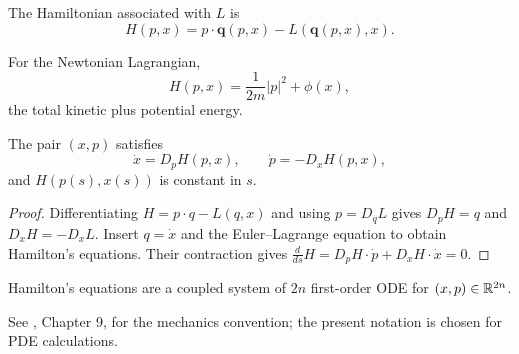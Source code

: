 \begin{definition}
\label{def:hamiltonian-from-lagrangian}
The Hamiltonian associated with $L$ is
\[
H(p,x)=p\cdot\mathbf q(p,x)-L(\mathbf q(p,x),x).
\]
\end{definition}

\begin{example}
\label{ex:hamiltonian-newtons-law}

For the Newtonian Lagrangian,
\[
H(p,x)=\frac1{2m}|p|^2+\phi(x),
\]
the total kinetic plus potential energy.
\end{example}

\begin{theorem}
\label{thm:hamiltons-ode-derivation}

The pair $(x,p)$ satisfies
\[
\dot x=D_pH(p,x),\qquad \dot p=-D_xH(p,x),
\]
and $H(p(s),x(s))$ is constant in $s$.
\end{theorem}

\begin{proof}
\sketch Differentiating $H=p\cdot q-L(q,x)$ and using $p=D_qL$ gives
$D_pH=q$ and $D_xH=-D_xL$. Insert $q=\dot x$ and the Euler--Lagrange
equation to obtain Hamilton's equations. Their contraction gives
$\frac d{ds}H=D_pH\cdot\dot p+D_xH\cdot\dot x=0$.
\end{proof}

\begin{remark}
\label{rem:hamiltons-ode-system-structure}

Hamilton's equations are a coupled system of $2n$ first-order ODE for
$(x,p)\in\mathbb{R}^{2n}$.
\end{remark}

\begin{remark}
\label{rem:arnold-mechanics-notation}
See \cite{Arnold1986}, Chapter 9, for the mechanics convention; the present
notation is chosen for PDE calculations.
\end{remark}

